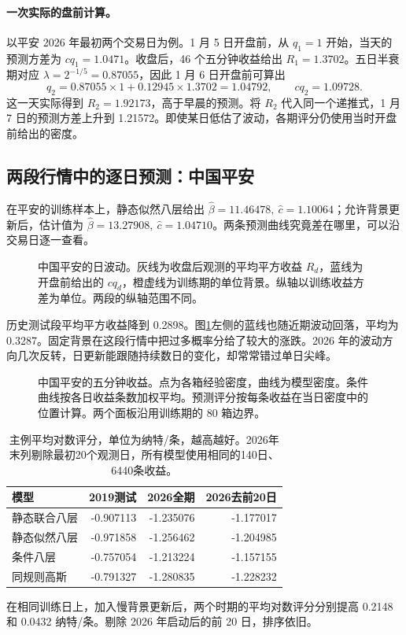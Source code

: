 \documentclass[11pt,a4paper]{article}
\newcommand{\chart}[4]{\begin{figure}[H]\centering\resizebox{#1\linewidth}{!}{}\caption{#3}\label{#4}\end{figure}}
\begin{document}
\paragraph{一次实际的盘前计算。}
以平安 2026 年最初两个交易日为例。1 月 5 日开盘前，从 $q_1=1$ 开始，当天的预测方差为 $c q_1=1.0471$。收盘后，46 个五分钟收益给出 $R_1=1.3702$。五日半衰期对应 $\lambda=2^{-1/5}=0.87055$，因此 1 月 6 日开盘前可算出
\[
 q_2=0.87055\times1+0.12945\times1.3702=1.04792,\qquad c q_2=1.09728.
\]
这一天实际得到 $R_2=1.92173$，高于早晨的预测。将 $R_2$ 代入同一个递推式，1 月 7 日的预测方差上升到 1.21572。即使某日低估了波动，各期评分仍使用当时开盘前给出的密度。


\clearpage
\subsection{两段行情中的逐日预测：中国平安}
在平安的训练样本上，静态似然八层给出 $\widehat\beta=11.46478,\ \widehat c=1.10064$；允许背景更新后，估计值为 $\widehat\beta=13.27908,\ \widehat c=1.04710$。两条预测曲线究竟差在哪里，可以沿交易日逐一查看。
\chart{.83}{conditional_scale}{中国平安的日波动。灰线为收盘后观测的平均平方收益 $R_d$，蓝线为开盘前给出的 $c q_d$，橙虚线为训练期的单位背景。纵轴以训练收益方差为单位。两段的纵轴范围不同。}{fig:scalepair}
历史测试段平均平方收益降到 0.2898。图\ref{fig:scalepair}左侧的蓝线也随近期波动回落，平均为 0.3287。固定背景在这段行情中把过多概率分给了较大的涨跌。2026 年的波动方向几次反转，日更新能跟随持续数日的变化，却常常错过单日尖峰。
\chart{.83}{conditional_density}{中国平安的五分钟收益。点为各箱经验密度，曲线为模型密度。条件曲线按各日收益条数加权平均。预测评分按每条收益在当日密度中的位置计算。两个面板沿用训练期的 80 箱边界。}{fig:changedensity}
\begin{table}[H]\centering\small
\caption{主例平均对数评分，单位为纳特/条，越高越好。2026年末列剔除最初20个观测日，所有模型使用相同的140日、6440条收益。}\label{tab:conditional_scores}
\begin{tabular}{lrrr}\toprule
模型 & 2019测试 & 2026全期 & 2026去前20日\\\midrule
静态联合八层 & -0.907113 & -1.235076 & -1.177017\\
静态似然八层 & -0.971858 & -1.256462 & -1.204985\\
条件八层 & -0.757054 & -1.213224 & -1.157155\\
同规则高斯 & -0.791327 & -1.280835 & -1.228232\\
\bottomrule\end{tabular}

\end{table}
在相同训练日上，加入慢背景更新后，两个时期的平均对数评分分别提高 0.2148 和 0.0432 纳特/条。剔除 2026 年启动后的前 20 日，排序依旧。
\end{document}

